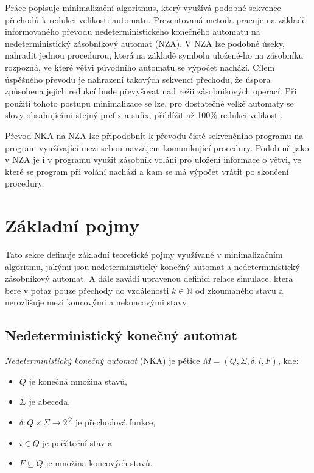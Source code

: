     Práce popisuje minimalizační algoritmus, který využívá podobné sekvence přechodů k redukci velikosti automatu. Prezentovaná metoda pracuje na základě informovaného převodu nedeterministického konečného automatu na nedeterministický zásobníkový automat (NZA). V NZA lze podobné úseky, nahradit jednou procedurou, která na základě symbolu uložené-ho na zásobníku rozpozná, ve které větvi původního automatu se výpočet nachází. Cílem úspěšného převodu je nahrazení takových sekvencí přechodu, že úspora způsobena jejich redukcí bude převyšovat nad režii zásobnikových operací. Při použití tohoto postupu minimalizace se lze, pro dostatečně velké automaty se slovy obsahujícími stejný prefix a sufix, přiblížit až 100\% redukci velikosti.

    Převod NKA na NZA lze připodobnit k převodu čistě sekvenčního programu na program využívající mezi sebou navzájem komunikující procedury. Podob-ně jako v NZA je i v programu využit zásobník volání pro uložení informace o větvi, ve které se program při volání nachází a kam se má výpočet vrátit po skončení procedury.

\section{Základní pojmy}
    Tato sekce definuje základní teoretické pojmy využívané v minimalizačním algoritmu, jakými jsou nedeterministický konečný automat a nedeterministický zásobníkový automat. A dále zavádí upravenou definici relace simulace, která bere v potaz pouze přechody do vzdálenosti $k \in \mathbb{N}$ od zkoumaného stavu a nerozlišuje mezi koncovými a nekoncovými stavy.

    \subsection{Nedeterministický konečný automat}
        \textit{Nedeterministický konečný automat} (NKA) je pětice $M = (Q, \Sigma, \delta, i, F)$, kde:
        \begin{itemize}
            \item $Q$ je konečná množina stavů,
            \item $\Sigma$ je abeceda,
            \item $\delta : Q \times \Sigma \rightarrow 2^Q$ je přechodová funkce,
            \item $i \in Q$ je počáteční stav a
            \item $F \subseteq Q$ je množina koncových stavů.
        \end{itemize}

